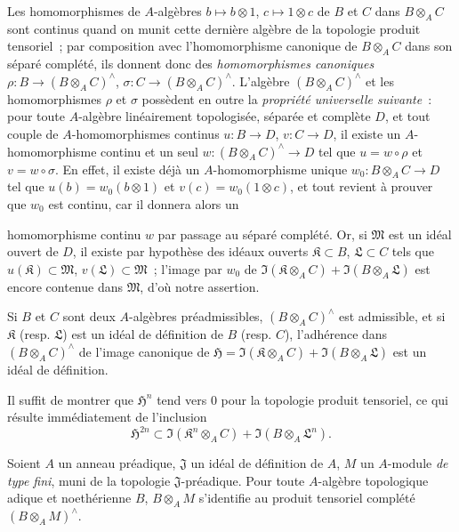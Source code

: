 \begin{env}[7.7.6]
\label{0.7.7.6-fr}
Les homomorphismes de $A$-algèbres $b\mapsto b\otimes 1$,
$c\mapsto 1\otimes c$ de $B$ et $C$ dans $B\otimes_A C$ sont continus
quand on munit cette dernière algèbre de la topologie produit tensoriel~;
par composition avec l'homomorphisme canonique de $B\otimes_A C$ dans son
séparé complété, ils donnent donc des \emph{homomorphismes canoniques}
$\rho:B\to(B\otimes_A C)^\wedge$, $\sigma:C\to(B\otimes_A C)^\wedge$.
L'algèbre $(B\otimes_A C)^\wedge$ et les homomorphismes $\rho$ et $\sigma$
possèdent en outre la \emph{propriété universelle suivante}~: pour toute
$A$-algèbre linéairement topologisée, séparée et complète $D$, et tout
couple de $A$-homomorphismes continus $u:B\to D$, $v:C\to D$, il existe un
$A$-homomorphisme continu et un seul
$w:(B\otimes_A C)^\wedge\to D$ tel que $u=w\circ\rho$ et
$v=w\circ\sigma$. En effet, il existe déjà un $A$-homomorphisme unique
$w_0:B\otimes_A C\to D$ tel que $u(b)=w_0(b\otimes 1)$ et
$v(c)=w_0(1\otimes c)$, et tout revient à prouver que $w_0$ est continu,
car il donnera alors un


homomorphisme continu $w$ par passage au séparé complété. Or, si
$\mathfrak M$ est un idéal ouvert de $D$, il existe par hypothèse des idéaux
ouverts $\mathfrak K\subset B$, $\mathfrak L\subset C$ tels que
$u(\mathfrak K)\subset\mathfrak M$, $v(\mathfrak L)\subset\mathfrak M$~;
l'image par $w_0$ de
$\Im(\mathfrak K\otimes_A C)+\Im(B\otimes_A\mathfrak L)$ est encore
contenue dans $\mathfrak M$, d'où notre assertion.
\end{env}

\begin{proposition}[7.7.7]
\label{0.7.7.7-fr}
Si $B$ et $C$ sont deux $A$-algèbres préadmissibles,
$(B\otimes_A C)^\wedge$ est admissible, et si $\mathfrak K$ (resp.
$\mathfrak L$) est un idéal de définition de $B$ (resp. $C$), l'adhérence
dans $(B\otimes_A C)^\wedge$ de l'image canonique de
$\mathfrak H=\Im(\mathfrak K\otimes_A C)+\Im(B\otimes_A\mathfrak L)$ est
un idéal de définition.
\end{proposition}

Il suffit de montrer que $\mathfrak H^n$ tend vers $0$ pour la topologie
produit tensoriel, ce qui résulte immédiatement de l'inclusion
\[
  \mathfrak H^{2n}\subset
  \Im(\mathfrak K^n\otimes_A C)+\Im(B\otimes_A\mathfrak L^n).
\]

\begin{proposition}[7.7.8]
\label{0.7.7.8-fr}
Soient $A$ un anneau préadique, $\mathfrak J$ un idéal de définition de
$A$, $M$ un $A$-module \emph{de type fini}, muni de la topologie
$\mathfrak J$-préadique. Pour toute $A$-algèbre topologique adique et
noethérienne $B$, $B\otimes_A M$ s'identifie au produit tensoriel complété
$(B\otimes_A M)^\wedge$.
\end{proposition}

